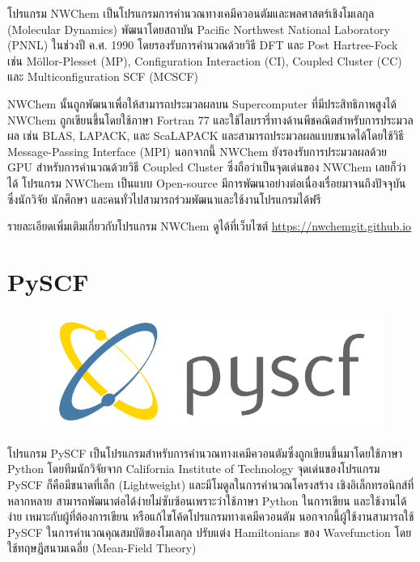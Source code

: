 โปรแกรม NWChem เป็นโปรแกรมการคำนวณทางเคมีควอนตัมและพลศาสตร์เชิงโมเลกุล (Molecular Dynamics)\autocite{apra2020} 
พัฒนาโดยสถาบัน Pacific Northwest National Laboratory (PNNL) ในช่วงปี ค.ศ. 1990 โดยรองรับการคำนวณด้วยวิธี DFT และ 
Post Hartree-Fock เช่น M\"{o}llor-Plesset (MP), Configuration Interaction (CI), Coupled Cluster (CC) และ
Multiconfiguration SCF (MCSCF) 

NWChem นั้นถูกพัฒนาเพื่อให้สามารถประมวลผลบน Supercomputer ที่มีประสิทธิภาพสูงได้ NWChem ถูกเขียนขึ้นโดยใช้ภาษา Fortran 77
และใช้ไลบรารี่ทางด้านพีชคณิตสำหรับการประมวลผล เช่น BLAS, LAPACK, และ ScaLAPACK และสามารถประมวลผลแบบขนาดได้โดยใช้วิธี 
Message-Passing Interface (MPI) นอกจากนี้ NWChem ยังรองรับการประมวลผลด้วย GPU สำหรับการคำนวณด้วยวิธี Coupled Cluster 
ซึ่งถือว่าเป็นจุดเด่นของ NWChem เลยก็ว่าได้ โปรแกรม NWChem เป็นแบบ Open-source มีการพัฒนาอย่างต่อเนื่องเรื่อยมาจนถึงปัจจุบัน ซึ่งนักวิจัย 
นักศึกษา และคนทั่วไปสามารถร่วมพัฒนาและใช้งานโปรแกรมได้ฟรี

รายละเอียดเพิ่มเติมเกี่ยวกับโปรแกรม NWChem ดูได้ที่เว็บไซต์ \url{https://nwchemgit.github.io}

\section{PySCF}
\label{sec:software_pyscf}

\begin{figure}[H]
    \centering
    \includegraphics[width=0.5\linewidth]{fig/logo_pyscf.png}
    \label{fig:logo_pyscf}
\end{figure}

โปรแกรม PySCF เป็นโปรแกรมสำหรับการคำนวณทางเคมีควอนตัมซึ่งถูกเขียนขึ้นมาโดยใช้ภาษา Python โดยทีมนักวิจัยจาก California Institute 
of Technology\autocite{sun2018} จุดเด่นของโปรแกรม PySCF ก็คือมีขนาดที่เล็ก (Lightweight) และมีโมดูลในการคำนวณโครงสร้าง%
เชิงอิเล็กทรอนิกส์ที่หลากหลาย สามารถพัฒนาต่อได้ง่ายไม่ซับซ้อนเพราะว่าใช้ภาษา Python ในการเขียน และใช้งานได้ง่าย เหมาะกับผู้ที่ต้องการเขียน%
หรือแก้ไขโค้ดโปรแกรมทางเคมีควอนตัม นอกจากนี้ผู้ใช้งานสามารถใช้ PySCF ในการคำนวณคุณสมบัติของโมเลกุล ปรับแต่ง Hamiltonians ของ 
Wavefunction โดยใช้ทฤษฎีสนามเฉลี่ย (Mean-Field Theory)

